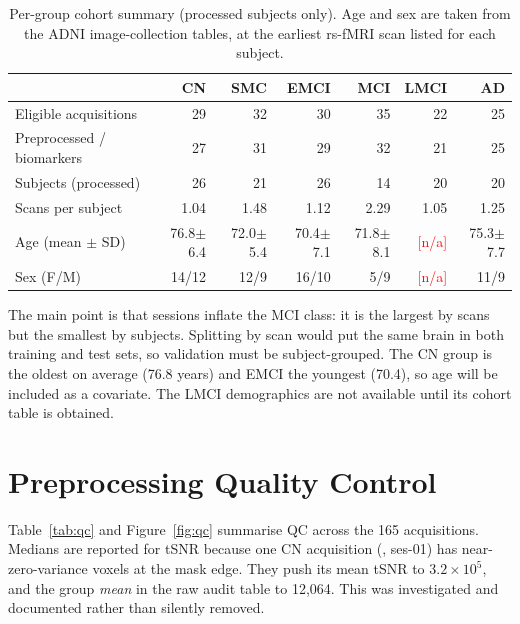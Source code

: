 \documentclass{ssnreview}
\newcommand{\hdr}{\rowcolor{SSNBlue!12}}                      %
\newcommand{\todo}[1]{\textcolor{red}{[#1]}}
\begin{document}
\begin{table}[H]
\centering
\setlength{\tabcolsep}{4.5pt}
\caption{Per-group cohort summary (processed subjects only). Age and sex
are taken from the ADNI image-collection tables, at the earliest rs-fMRI scan
listed for each subject.}\label{tab:cohort}
\small
\begin{tabular}{lrrrrrr}
\toprule
\hdr  & CN & SMC & EMCI & MCI & LMCI & AD\\
\midrule
Eligible acquisitions      & 29 & 32 & 30 & 35 & 22 & 25\\
Preprocessed / biomarkers  & 27 & 31 & 29 & 32 & 21 & 25\\
Subjects (processed)       & 26 & 21 & 26 & 14 & 20 & 20\\
Scans per subject          & 1.04 & 1.48 & 1.12 & 2.29 & 1.05 & 1.25\\
Age (mean $\pm$ SD)        & 76.8$\pm$6.4 & 72.0$\pm$5.4 & 70.4$\pm$7.1 & 71.8$\pm$8.1 & \todo{n/a} & 75.3$\pm$7.7\\
Sex (F/M)                  & 14/12 & 12/9 & 16/10 & 5/9 & \todo{n/a} & 11/9\\
\bottomrule
\end{tabular}
\end{table}

The main point is that sessions inflate the MCI class: it is the largest by
scans but the smallest by subjects. Splitting by scan would put the same brain
in both training and test sets, so validation must be subject-grouped. The
CN group is the oldest on average (76.8 years) and EMCI the youngest (70.4),
so age will be included as a covariate. The LMCI demographics are not
available until its cohort table is obtained.

\section{Preprocessing Quality Control}
Table~\ref{tab:qc} and Figure~\ref{fig:qc} summarise QC across the 165
acquisitions. Medians are reported for tSNR because one CN acquisition
(, ses-01) has near-zero-variance voxels at the mask edge.
They push its mean tSNR to $3.2\times10^5$, and the group \emph{mean} in the
raw audit table to 12,064. This was investigated and documented rather than
silently removed.
\end{document}
